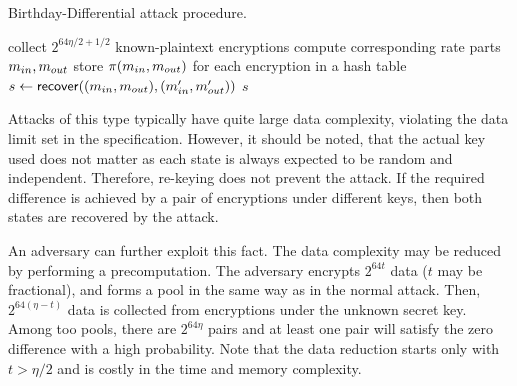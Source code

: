 \begin{algorithm}
    \caption{
    \label{alg:bday-diff}
    Birthday-Differential attack procedure.}
    {
    \fontsize{9}{12}\selectfont %
    \begin{algorithmic}
        \State collect $2^{64\eta/2+1/2}$ known-plaintext encryptions
        \State compute corresponding rate parts $m_{in}, m_{out}$
        \State store $\pi(m_{in},m_{out})$ for each encryption in a hash table
                \State $s \gets \mathsf{recover}((m_{in},m_{out}),(m_{in}',m_{out}'))$
                \State \Return $s$
            \EndIf
        \EndFor
    \end{algorithmic}
    }
\end{algorithm}

Attacks of this type typically have quite large data complexity, violating the data limit set in the specification. However, it should be noted, that the actual key used does not matter as each state is always expected to be random and independent. Therefore, re-keying does not prevent the attack. If the required difference is achieved by a pair of encryptions under different keys, then both states are recovered by the attack.

An adversary can further exploit this fact. The data complexity may be reduced by performing a precomputation. The adversary encrypts $2^{64 t}$ data ($t$ may be fractional), and forms a pool in the same way as in the normal attack. Then, $2^{64(\eta-t)}$ data is collected from encryptions under the unknown secret key. Among too pools, there are $2^{64\eta}$ pairs and at least one pair will satisfy the zero difference with a high probability. Note that the data reduction starts only with $t > \eta / 2$ and is costly in the time and memory complexity.

